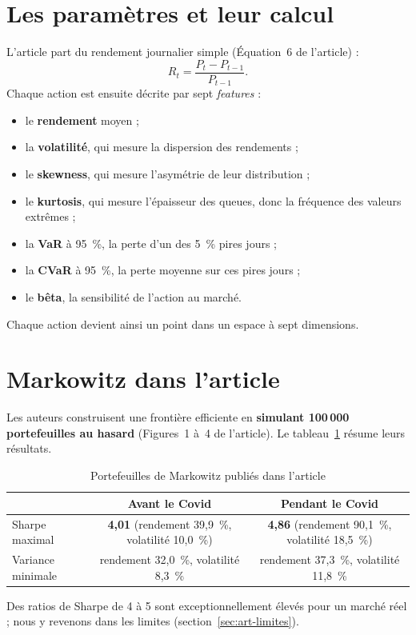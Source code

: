 \documentclass[11pt,a4paper]{article}
\newcommand{\pc}{~\%}
\begin{document}
\section{Les paramètres et leur calcul}\label{sec:art-features}
L'article part du rendement journalier simple (Équation~6 de l'article) :
\begin{equation}
R_t = \frac{P_t - P_{t-1}}{P_{t-1}}.
\end{equation}
Chaque action est ensuite décrite par sept \emph{features} :
\begin{itemize}
  \item le \textbf{rendement} moyen ;
  \item la \textbf{volatilité}, qui mesure la dispersion des rendements ;
  \item le \textbf{skewness}, qui mesure l'asymétrie de leur distribution ;
  \item le \textbf{kurtosis}, qui mesure l'épaisseur des queues, donc la fréquence des valeurs extrêmes ;
  \item la \textbf{VaR} à 95\pc{}, la perte d'un des 5\pc{} pires jours ;
  \item la \textbf{CVaR} à 95\pc{}, la perte moyenne sur ces pires jours ;
  \item le \textbf{bêta}, la sensibilité de l'action au marché.
\end{itemize}
Chaque action devient ainsi un point dans un espace à sept dimensions.

\section{Markowitz dans l'article}\label{sec:art-markowitz}
Les auteurs construisent une frontière efficiente en \textbf{simulant 100\,000 portefeuilles au hasard} (Figures~1 à~4 de l'article). Le tableau~\ref{tab:art-markowitz} résume leurs résultats.

\begin{table}[H]\centering\small
\caption{Portefeuilles de Markowitz publiés dans l'article}\label{tab:art-markowitz}
\begin{tabular}{lcc}\toprule
 & Avant le Covid & Pendant le Covid \\ \midrule
Sharpe maximal & \textbf{4,01} (rendement 39,9\pc{}, volatilité 10,0\pc{}) & \textbf{4,86} (rendement 90,1\pc{}, volatilité 18,5\pc{}) \\
Variance minimale & rendement 32,0\pc{}, volatilité 8,3\pc{} & rendement 37,3\pc{}, volatilité 11,8\pc{} \\
\bottomrule\end{tabular}
\end{table}
Des ratios de Sharpe de 4 à 5 sont exceptionnellement élevés pour un marché réel ; nous y revenons dans les limites (section~\ref{sec:art-limites}).
\end{document}
